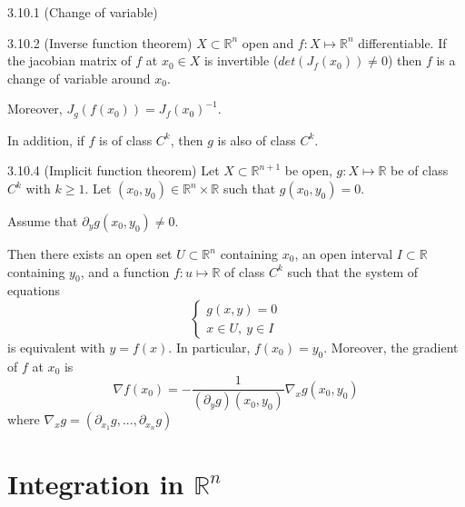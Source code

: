 \documentclass[8pt,a4paper,twocolumn,table]{extarticle}
\newcommand{\R}{\mathbb{R}}
\begin{document}
\begin{definition}{3.10.1 (Change of variable)}

\end{definition}

\begin{theorem}{3.10.2 (Inverse function theorem)}
    $X \subset \R^n$ open and $f: X \mapsto \R^n$ differentiable.
    If the jacobian matrix of $f$ at $x_0 \in X$ is invertible ($det(J_f(x_0)) \ne 0$) then $f$ is a change of variable around $x_0$.

    Moreover, $J_g(f(x_0)) = J_f(x_0)^{-1}$.

    In addition, if $f$ is of class $C^k$, then $g$ is also of class $C^k$.
\end{theorem}

\begin{theorem}{3.10.4 (Implicit function theorem)}
    Let $X \subset \R^{n + 1}$ be open, $g: X \mapsto \R$ be of class $C^k$ with $k \ge 1$. Let $(x_0, y_0) \in \R^n \times \R$
    such that $g(x_0, y_0) = 0$.

    Assume that $\partial_y g(x_0, y_0) \ne 0$.

    Then there exists an open set $U \subset \R^n$ containing $x_0$, an open interval $I \subset \R$ containing $y_0$, and a function
    $f: u \mapsto \R$ of class $C^k$ such that the system of equations
    \[ \begin{cases}
            g(x,y) = 0 \\
            x \in U,\ y \in I
        \end{cases} \]
    is equivalent with $y = f(x)$. In particular, $f(x_0) = y_0$. Moreover, the gradient of $f$ at $x_0$ is
    \[ \nabla f(x_0) = - \frac{1}{(\partial_y g)(x_0, y_0)} \nabla_x g(x_0, y_0) \]
    where $\nabla_x g = (\partial_{x_1} g, ..., \partial_{x_n} g)$
\end{theorem}

\section[Integration in multiple dimensions]{Integration in $\R^n$}
\end{document}
